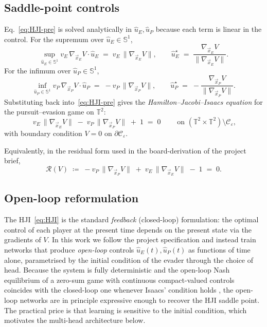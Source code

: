 \documentclass[11pt]{article}
\newcommand{\xE}{\vec{x}_E}
\newcommand{\xP}{\vec{x}_P}
\newcommand{\uE}{\hat{u}_E}
\newcommand{\uP}{\hat{u}_P}
\newcommand{\TT}{\mathbb{T}^{2}}
\begin{document}
\subsection{Saddle-point controls}
Eq.~\eqref{eq:HJI-pre} is solved analytically in $\uE,\uP$ because each
term is linear in the control.  For the supremum over $\uE\in\mathbb{S}^1$,
\begin{equation}
\sup_{\uE\in\mathbb{S}^1} v_E\,\nabla_{\xE}V\cdot\uE
\;=\;
v_E\,\|\nabla_{\xE}V\|,
\qquad
\uE^\star \;=\; \frac{\nabla_{\xE}V}{\|\nabla_{\xE}V\|}.
\end{equation}
For the infimum over $\uP\in\mathbb{S}^1$,
\begin{equation}
\inf_{\uP\in\mathbb{S}^1} v_P\,\nabla_{\xP}V\cdot\uP
\;=\;
-v_P\,\|\nabla_{\xP}V\|,
\qquad
\uP^\star \;=\; -\frac{\nabla_{\xP}V}{\|\nabla_{\xP}V\|}.
\end{equation}
Substituting back into~\eqref{eq:HJI-pre} gives the
\emph{Hamilton--Jacobi--Isaacs equation} for the pursuit--evasion game
on $\TT$:
\begin{equation}
\label{eq:HJI}
\boxed{\;
v_E\,\|\nabla_{\xE}V\| \;-\; v_P\,\|\nabla_{\xP}V\| \;+\; 1 \;=\; 0
\;}
\qquad \text{on } (\TT\times\TT)\setminus\mathcal{C}_\varepsilon,
\end{equation}
with boundary condition $V = 0$ on $\partial\mathcal{C}_\varepsilon$.

\noindent
Equivalently, in the residual form used in the board-derivation of the
project brief,
\begin{equation}
\mathcal{R}(V) \;\coloneqq\;
- v_P\,\|\nabla_{\xP}V\| \;+\; v_E\,\|\nabla_{\xE}V\| \;-\; 1 \;=\; 0.
\end{equation}

\subsection{Open-loop reformulation}
The HJI~\eqref{eq:HJI} is the standard \emph{feedback} (closed-loop)
formulation: the optimal control of each player at the present time
depends on the present state via the gradients of $V$.  In this work we
follow the project specification and instead train networks that
produce \emph{open-loop} controls
$\uE(t),\uP(t)$ as functions of time alone, parametrised by the initial
condition of the evader through the choice of head.  Because the system
is fully deterministic and the open-loop Nash equilibrium of a
zero-sum game with continuous compact-valued controls coincides with
the closed-loop one whenever Isaacs' condition holds
\citep{basar1999dynamic, elliotkalton1972}, the open-loop networks are
in principle expressive enough to recover the HJI saddle point.  The
practical price is that learning is sensitive to the initial condition,
which motivates the multi-head architecture below.
\end{document}
